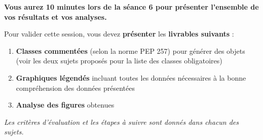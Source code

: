 
\textbf{Vous aurez 10 minutes lors de la séance 6 pour présenter l'ensemble de vos résultats et vos analyses.}

Pour valider cette session, vous devez \textbf{présenter} les \textbf{livrables suivants} :

\begin{enumerate}
\item \textbf{Classes commentées} (selon la norme PEP 257) pour générer des objets (voir les deux sujets proposés pour la liste des classes obligatoires)
\item \textbf{Graphiques légendés} incluant toutes les données nécessaires à la bonne compréhension des données présentées
\item \textbf{Analyse des figures} obtenues 
\end{enumerate}

\bigskip

\textit{Les critères d'évaluation et les étapes à suivre sont donnés dans chacun des sujets.}
